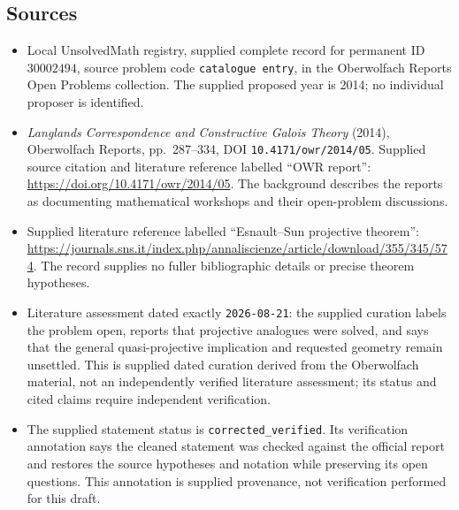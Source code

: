 \documentclass[11pt]{article}
\begin{document}
\subsection{Sources}
\begin{itemize}
\item Local UnsolvedMath registry, supplied complete record for permanent ID \(30002494\), source problem code \texttt{catalogue entry}, in the Oberwolfach Reports Open Problems collection. The supplied proposed year is 2014; no individual proposer is identified.
\item \emph{Langlands Correspondence and Constructive Galois Theory} (2014), Oberwolfach Reports, pp.\ 287--334, DOI \texttt{10.4171/owr/2014/05}. Supplied source citation and literature reference labelled ``OWR report'': \url{https://doi.org/10.4171/owr/2014/05}. The background describes the reports as documenting mathematical workshops and their open-problem discussions.
\item Supplied literature reference labelled ``Esnault--Sun projective theorem'': \url{https://journals.sns.it/index.php/annaliscienze/article/download/355/345/574}. The record supplies no fuller bibliographic details or precise theorem hypotheses.
\item Literature assessment dated exactly \texttt{2026-08-21}: the supplied curation labels the problem open, reports that projective analogues were solved, and says that the general quasi-projective implication and requested geometry remain unsettled. This is supplied dated curation derived from the Oberwolfach material, not an independently verified literature assessment; its status and cited claims require independent verification.
\item The supplied statement status is \texttt{corrected\_verified}. Its verification annotation says the cleaned statement was checked against the official report and restores the source hypotheses and notation while preserving its open questions. This annotation is supplied provenance, not verification performed for this draft.
\end{itemize}
\end{document}
